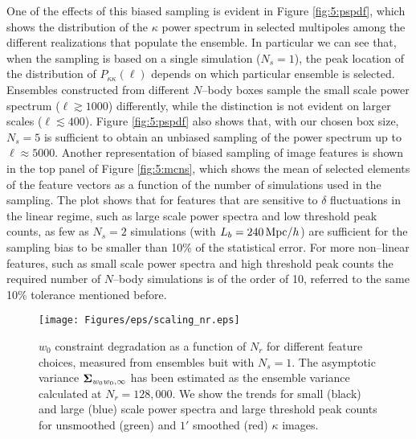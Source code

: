 %
One of the effects of this biased sampling is evident in Figure \ref{fig:5:pspdf}, which shows the distribution of the $\kappa$ power spectrum in selected multipoles among the different realizations that populate the ensemble. In particular we can see that, when the sampling is based on a single simulation ($N_s=1$), the peak location of the distribution of $P_{\kappa\kappa}(\ell)$ depends on which particular ensemble is selected. Ensembles constructed from different $N$--body boxes sample the small scale power spectrum ($\ell\gtrsim 1000$) differently, while the distinction is not evident on larger scales ($\ell\lesssim 400$). Figure \ref{fig:5:pspdf} also shows that, with our chosen box size, $N_s=5$ is sufficient to obtain an unbiased sampling of the power spectrum up to $\ell\approx5000$. Another representation of biased sampling of image features is shown in the top panel of Figure \ref{fig:5:mcns}, which shows the mean of selected elements of the feature vectors as a function of the number of simulations used in the sampling. The plot shows that for features that are sensitive to $\delta$ fluctuations in the linear regime, such as large scale power spectra and low threshold peak counts, as few as $N_s=2$ simulations (with $L_b=240\,{\rm Mpc}/h$) are sufficient for the sampling bias to be smaller than 10\% of the statistical error. For more non--linear features, such as small scale power spectra and high threshold peak counts the required number of $N$--body simulations is of the order of 10, referred to the same 10\% tolerance mentioned before.    
%
\begin{figure}
\begin{center}
\texttt{[image: Figures/eps/scaling\_nr.eps]}
\end{center}
\caption{$w_0$ constraint degradation as a function of $N_r$ for different feature choices, measured from ensembles buit with $N_s=1$. The asymptotic variance $\mathbf{\Sigma}_{w_0w_0,\infty}$ has been estimated as the ensemble variance calculated at $N_r=128,000$. We show the trends for small (black) and large (blue) scale power spectra and large threshold peak counts for unsmoothed (green) and $1'$ smoothed (red) $\kappa$ images.}
\label{fig:5:pseudonr}
\end{figure}
%
